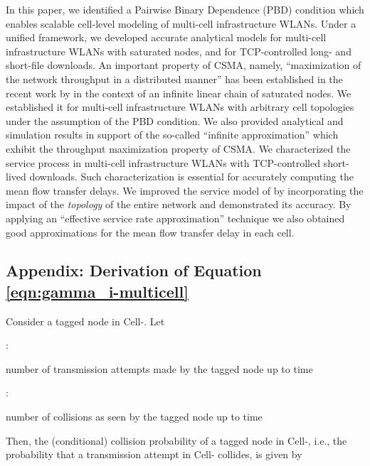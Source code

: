 \documentclass[10pt,a4paper,journal]{IEEEtran}
\theoremstyle{definition}
\theoremstyle{remark}
\theoremstyle{plain}
\begin{document}
In this paper, we identified a Pairwise Binary Dependence (PBD) condition which enables scalable cell-level modeling of multi-cell infrastructure WLANs. Under a unified framework, we developed accurate analytical models for multi-cell infrastructure WLANs with saturated nodes, and for TCP-controlled long- and short-file downloads. An important property of CSMA, namely, ``maximization of the network throughput in a distributed manner'' has been established in the recent work by \cite{wanet.durvy09selfOrganization} in the context of an infinite linear chain of saturated nodes. We established it for multi-cell infrastructure WLANs with arbitrary cell topologies under the assumption of the PBD condition. We also provided analytical and simulation results in support of the so-called ``infinite  approximation'' which exhibit the throughput maximization property of CSMA. We characterized the service process in multi-cell infrastructure WLANs with TCP-controlled short-lived downloads. Such characterization is essential for accurately computing the mean flow transfer delays. We improved the service model of \cite{wanet.bonald08multicellprocsharing} by incorporating the impact of the \textit{topology} of the entire network and demonstrated its accuracy. By applying an ``effective service rate approximation'' technique we also obtained good approximations for the mean flow transfer delay in each cell. 



\appendix


\subsection{Appendix: Derivation of Equation \eqref{eqn:gamma_i-multicell}} 
\label{app:derivation-eqn-gamma_i}

Consider a tagged node in Cell-. Let

\vspace{1mm}

 : \parbox[t]{6cm}{number of transmission attempts made by the tagged node up to time }

\vspace{1mm}

 : \parbox[t]{6cm}{number of collisions as seen by the tagged node up to time } 

\vspace{1mm}


Then, the (conditional) collision probability  of a tagged node in Cell-, i.e., the probability that a transmission attempt in Cell- collides, is given by
\end{document}
